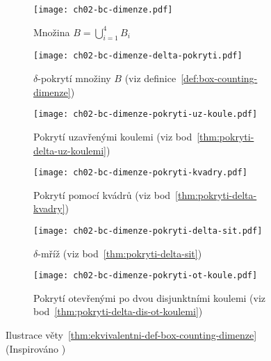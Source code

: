 \begin{figure}
    \centering
    \begin{subfigure}{0.4\textwidth}
        \centering
        \texttt{[image: ch02-bc-dimenze.pdf]}
        \caption{Množina $B=\bigcup_{i=1}^4 B_i$}
        \label{subfig:bc-dimenze-pokryvana-mnozina}
    \end{subfigure}
    \qquad
    \begin{subfigure}{0.4\textwidth}
        \centering
        \texttt{[image: ch02-bc-dimenze-delta-pokryti.pdf]}
        \caption{$\delta$-pokrytí množiny $B$ (viz definice~\ref{def:box-counting-dimenze})}
        \label{subfig:bc-dimenze-delta-pokryti}
    \end{subfigure}
    \qquad
    \begin{subfigure}{0.4\textwidth}
        \centering
        \texttt{[image: ch02-bc-dimenze-pokryti-uz-koule.pdf]}
        \caption{Pokrytí uzavřenými koulemi (viz bod~\ref{thm:pokryti-delta-uz-koulemi})}
        \label{subfig:bc-dimenze-uz-koule}
    \end{subfigure}
    \qquad
    \begin{subfigure}{0.4\textwidth}
        \centering
        \texttt{[image: ch02-bc-dimenze-pokryti-kvadry.pdf]}
        \caption{Pokrytí pomocí kvádrů (viz bod~\ref{thm:pokryti-delta-kvadry})}
        \label{subfig:bc-dimenze-kvadry}
    \end{subfigure}
    \qquad
    \begin{subfigure}{0.4\textwidth}
        \centering
        \texttt{[image: ch02-bc-dimenze-pokryti-delta-sit.pdf]}
        \caption{$\delta$-mříž (viz bod~\ref{thm:pokryti-delta-sit})}
        \label{subfig:bc-dimenze-delta-sit}
    \end{subfigure}
    \qquad
    \begin{subfigure}{0.4\textwidth}
        \centering
        \texttt{[image: ch02-bc-dimenze-pokryti-ot-koule.pdf]}
        \caption{Pokrytí otevřenými po dvou disjunktními koulemi (viz bod~\ref{thm:pokryti-delta-dis-ot-koulemi})}
        \label{subfig:bc-dimenze-ot-koule}
    \end{subfigure}
    \caption[Ilustrace věty~\ref{thm:ekvivalentni-def-box-counting-dimenze}]{Ilustrace věty~\ref{thm:ekvivalentni-def-box-counting-dimenze} (Inspirováno \citep[str. 29]{Falconer2014})}
    \label{fig:ilustrace-definic-bc-dimenze}
\end{figure}

